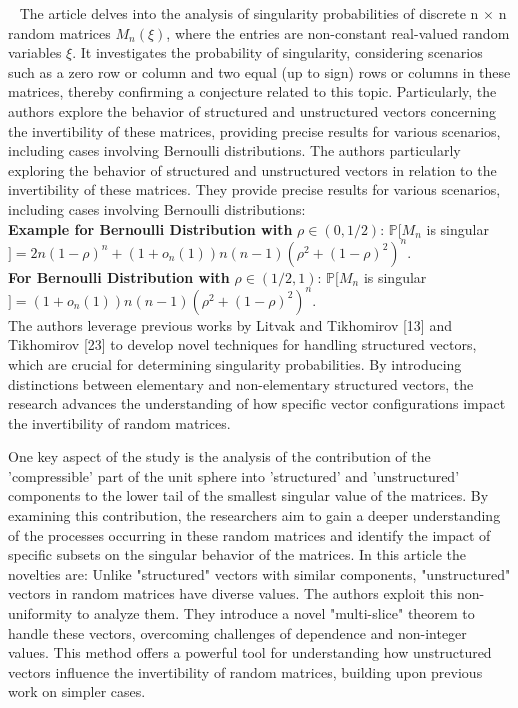 ~\cite{jain2021singularity}
The article delves into the analysis of singularity probabilities of discrete n $\times$ n random matrices ${M_n}(\xi)$, where the entries are non-constant real-valued random variables $\xi$. 
It investigates the probability of singularity, considering scenarios such as a zero row or column and two equal (up to sign) rows or columns in these matrices, thereby confirming a conjecture related to this topic. Particularly, the authors explore the behavior of structured and unstructured vectors concerning the invertibility of these matrices, providing precise results for various scenarios, including cases involving Bernoulli distributions.
The authors particularly exploring the behavior of structured and unstructured vectors in relation to the invertibility of these matrices. 
They provide precise results for various scenarios, including cases involving Bernoulli distributions:\\
\textbf{Example for Bernoulli Distribution with} $\rho \in (0, 1/2)$:
$\mathbb{P}[M_n$ is singular$]=2n(1-\rho)^n + (1+o_n(1))n(n-1)(\rho^2+(1-\rho)^2)^n$.\\
\textbf{For Bernoulli Distribution with} $\rho \in (1/2, 1)$:
$\mathbb{P}[M_n$ is singular$]=(1+o_n(1))n(n-1)(\rho^2+(1-\rho)^2)^n$.\\
The authors leverage previous works by Litvak and Tikhomirov [13] and Tikhomirov [23] to develop novel techniques for handling structured vectors, which are crucial for determining singularity probabilities.
By introducing distinctions between elementary and non-elementary structured vectors, the research advances the understanding of how specific vector configurations impact the invertibility of random matrices.


One key aspect of the study is the analysis of the contribution of the 'compressible' part of the unit sphere into 'structured' and 'unstructured' components to the lower tail of the smallest singular value of the matrices.
By examining this contribution, the researchers aim to gain a deeper understanding of the processes occurring in these random matrices and identify the impact of specific subsets on the singular behavior of the matrices.
In this article the novelties are:
Unlike "structured" vectors with similar components, "unstructured" vectors in random matrices have diverse values. The authors exploit this non-uniformity to analyze them. They introduce a novel "multi-slice" theorem to handle these vectors, overcoming challenges of dependence and non-integer values. This method offers a powerful tool for understanding how unstructured vectors influence the invertibility of random matrices, building upon previous work on simpler cases.
